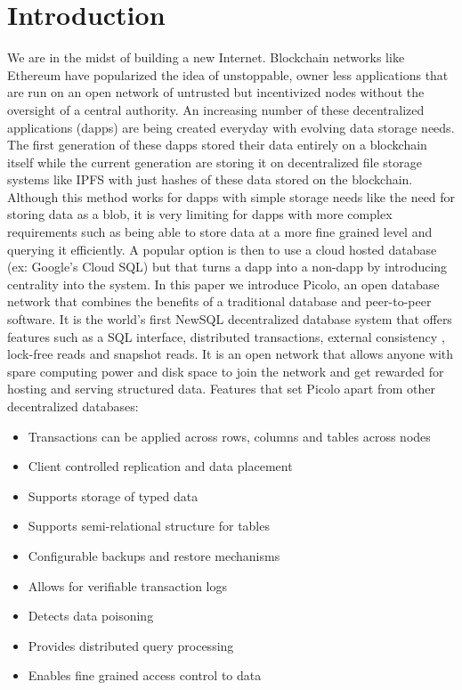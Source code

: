 \documentclass[preprint,10pt]{elsarticle}
\begin{document}
\section{Introduction}\label{Sect:Introduction}
We are in the midst of building a new Internet. Blockchain networks like Ethereum have popularized the idea of unstoppable, owner less applications that are run on an open network of untrusted but incentivized nodes without the oversight of a central authority. An increasing number of these decentralized applications (dapps) are being created everyday with evolving data storage needs. The first generation of these dapps stored their data entirely on a blockchain itself while the current generation are storing it on decentralized file storage systems like IPFS with just hashes of these data stored on the blockchain. Although this method works for dapps with simple storage needs like the need for storing data as a blob, it is very limiting for dapps with more complex requirements such as being able to store data at a more fine grained level and querying it efficiently. A popular option is then to use a cloud hosted database (ex: Google’s Cloud SQL) but that turns a dapp into a non-dapp by introducing centrality into the system. \newline\newline
In this paper we introduce Picolo, an open database network that combines the benefits of a traditional database and peer-to-peer software. It is the world’s first NewSQL decentralized database system that offers features such as a SQL interface, distributed transactions, external consistency \cite{External_Consistency}, lock-free reads and snapshot reads. It is an open network that allows anyone with spare computing power and disk space to join the network and get rewarded for hosting and serving structured data.
\newline\newline
Features that set Picolo apart from other decentralized databases:
\begin{itemize}
	\item Transactions can be applied across rows, columns and tables across nodes
	\item Client controlled replication and data placement
	\item Supports storage of typed data
	\item Supports semi-relational structure for tables
	\item Configurable backups and restore mechanisms
	\item Allows for verifiable transaction logs
	\item Detects data poisoning
	\item Provides distributed query processing
	\item Enables fine grained access control to data
	\newline
\end{itemize}
\end{document}
